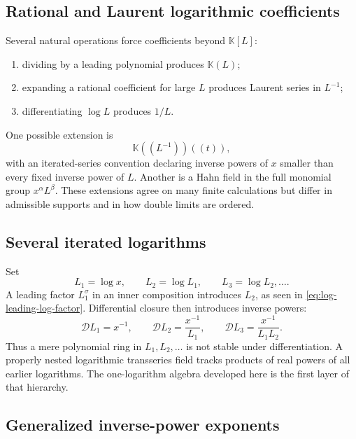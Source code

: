 \documentclass[11pt]{article}
\theoremstyle{pltheorem}
\newcommand{\K}{\mathbb K}
\newcommand{\D}{\mathcal D}
\begin{document}
\subsection{Rational and Laurent logarithmic coefficients}

Several natural operations force coefficients beyond \(\K[L]\):
\begin{enumerate}
\item dividing by a leading polynomial produces \(\K(L)\);
\item expanding a rational coefficient for large \(L\) produces Laurent series in \(L^{-1}\);
\item differentiating \(\log L\) produces \(1/L\).
\end{enumerate}
One possible extension is
\begin{equation}\label{eq:Linv-extension}
 \K((L^{-1}))((t)),
\end{equation}
with an iterated-series convention declaring inverse powers of \(x\) smaller than every fixed inverse power of \(L\).  Another is a Hahn field in the full monomial group \(x^\alpha L^\beta\).  These extensions agree on many finite calculations but differ in admissible supports and in how double limits are ordered.

\subsection{Several iterated logarithms}

Set
\begin{equation}\label{eq:iterated-logs}
 L_1=\log x,
 \qquad L_2=\log L_1,
 \qquad L_3=\log L_2,\ldots.
\end{equation}
A leading factor \(L_1^\sigma\) in an inner composition introduces \(L_2\), as seen in \cref{eq:log-leading-log-factor}.  Differential closure then introduces inverse powers:
\begin{equation}\label{eq:iterated-log-derivatives}
 \D L_1=x^{-1},
 \qquad
 \D L_2=\frac{x^{-1}}{L_1},
 \qquad
 \D L_3=\frac{x^{-1}}{L_1L_2}.
\end{equation}
Thus a mere polynomial ring in \(L_1,L_2,\ldots\) is not stable under differentiation.  A properly nested logarithmic transseries field tracks products of real powers of all earlier logarithms.  The one-logarithm algebra developed here is the first layer of that hierarchy.

\subsection{Generalized inverse-power exponents}
\end{document}
